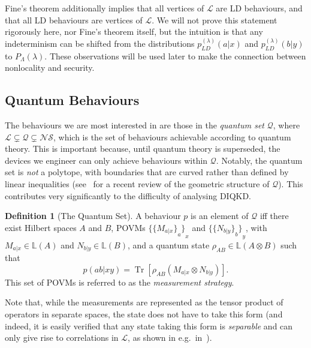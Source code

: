 \documentclass[10pt, a4paper]{article}
\numberwithin{equation}{section} %
\newcounter{stmt} %
\theoremstyle{definition}
\newtheorem{defn}[stmt]{Definition}
\theoremstyle{plain}
\newcommand{\?}{\mathrel{?}} %
\newcommand{\Lin}[1]{\mathbb{L}\left(#1\right)}
\newcommand{\Tr}[2][]{\mathop{\mathrm{Tr}#1}\left[ #2 \right]} %
\newcommand{\Ls}{\mathcal{L}}
\newcommand{\Qs}{\mathcal{Q}}
\newcommand{\NSs}{\mathcal{NS}}
\begin{document}
    Fine's theorem additionally implies that all vertices of \(\Ls\) are LD behaviours, and that all LD behaviours are vertices of \(\Ls\). We will not prove this statement rigorously here, nor Fine's theorem itself, but the intuition is that any indeterminism can be shifted from the distributions \(p_{LD}^{(\lambda)}(a|x)\) and \(p_{LD}^{(\lambda)}(b|y)\) to \(P_{\Lambda}(\lambda)\). These observations will be used later to make the connection between nonlocality and security.

    \subsection{Quantum Behaviours}\label{sec:nl_Q}

  The behaviours we are most interested in are those in the \emph{quantum set} \(\Qs\), where \(\Ls \subsetneq \Qs \subsetneq \NSs\), which is the set of behaviours achievable according to quantum theory. This is important because, until quantum theory is superseded, the devices we engineer can only achieve behaviours within \(\Qs\). Notably, the quantum set is \emph{not} a polytope, with boundaries that are curved rather than defined by linear inequalities (see~\cite{QGeometry} for a recent review of the geometric structure of \(\Qs\)). This contributes very significantly to the difficulty of analysing DIQKD\@.

    \begin{defn}[The Quantum Set]
      A behaviour \(p\) is an element of \(\Qs\) iff there exist Hilbert spaces \(A\) and \(B\), POVMs \({\{{\{M_{a|x}\}}_a\}}_x\) and \({\{{\{N_{b|y}\}}_b\}}_y\), with \(M_{a|x} \in \Lin{A}\) and \(N_{b|y} \in \Lin{B}\), and a quantum state \(\rho_{AB} \in \Lin{A\otimes{B}}\) such that
      \begin{equation}\label{eqn:Qprob}
        p(ab|xy) = \Tr{\rho_{AB} \left(M_{a|x} \otimes N_{b|y}\right) }.
      \end{equation}
      This set of POVMs is referred to as the \emph{measurement strategy}.
    \end{defn}
    Note that, while the measurements are represented as the tensor product of operators in separate spaces, the state does not have to take this form (and indeed, it is easily verified that any state taking this form is \emph{separable} and can only give rise to correlations in \(\Ls\), as shown in e.g.\ in~\cite[Ax. 3]{FiniteDimNonconvex}).
\end{document}
